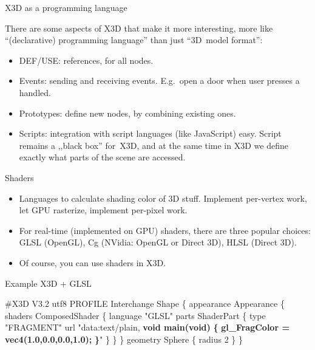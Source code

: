 \documentclass{beamer}
\begin{document}
\begin{frame}{X3D as a programming language}

There are some aspects of X3D that make it more interesting,
more like ``(declarative) programming language'' than just ``3D~model format'':

\begin{itemize}
  \item DEF/USE: references, for all nodes.
  \item Events: sending and receiving events.
    E.g.~open a door when user presses a handled.
  \item Prototypes: define new nodes,
    by combining existing ones.
  \item Scripts: integration with script languages (like JavaScript) easy.
    Script remains a ,,black box'' for~X3D, and at the same time
    in X3D we define exactly what parts of the scene are accessed.
\end{itemize}
\end{frame}

\begin{frame}{Shaders}

\begin{itemize}
  \item Languages to calculate shading color of 3D stuff.
    Implement per-vertex work,
    let GPU rasterize, implement per-pixel work.
  \item For real-time (implemented on GPU) shaders, there are three
    popular choices: GLSL (OpenGL), Cg (NVidia: OpenGL or Direct 3D),
    HLSL (Direct 3D).
  \item Of course, you can use shaders in X3D.
\end{itemize}
\end{frame}

\begin{frame}[fragile]
\begin{exampleblock}{Example X3D + GLSL}
\begin{semiverbatim}
\#X3D V3.2 utf8
PROFILE Interchange
Shape \{
  appearance Appearance \{
    shaders ComposedShader \{
      language "GLSL"
      parts ShaderPart \{
        type "FRAGMENT"
        url "data:text/plain,
        \textbf{void main(void)}
        \textbf{\{}
          \textbf{gl\_FragColor = vec4(1.0,0.0,0.0,1.0);}
        \textbf{\}}" \} \} \}
  geometry Sphere \{ radius 2 \}
\}
\end{semiverbatim}
\end{exampleblock}
\end{frame}
\end{document}
